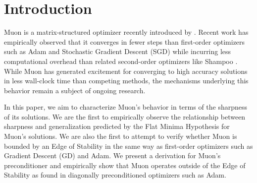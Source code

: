 \documentclass{article}
\theoremstyle{plain}
\theoremstyle{definition}
\theoremstyle{remark}
\begin{document}
\begin{abstract}

We study the Muon optimizer using sharpness and provide the first empirical evidence that the Flat Minima Hypothesis also applies to Muon. Further, we derive Muon's implicit preconditioner to analyze its potential Edge of Stability behavior. Experiments on CIFAR-10 show sharpness strongly correlates with generalization gap within each optimizer (Pearson $r=0.45-0.69, p\leq10^{-4}$), confirming the hypothesis holds for Muon similarly to Adam and SGD. However, Muon operates above the classical sharpness-based Adaptive Edge of Stability threshold that bounds diagonally-preconditioned optimizers like Adam and RMSprop, yet remains stable. Our findings suggest Muon operates in a fundamentally different regime than diagonally-adaptive methods. Defining the exact stability boundary for Muon remains an open question. All code is available at \url{https://github.com/NikoCovic/DL-project}.
\end{abstract}

\section{Introduction}
\label{introduction}

Muon is a matrix-structured optimizer recently introduced by \citet{jordan2024muon}. Recent work has empirically observed that it converges in fewer steps than first-order optimizers such as Adam \cite{kingma2014adam} and Stochastic Gradient Descent (SGD) while incurring less computational overhead than related second-order optimizers like Shampoo \cite{gupta2018shampoo}. While Muon has generated excitement for converging to high accuracy solutions in less wall-clock time than competing methods, the mechanisms underlying this behavior remain a subject of ongoing research. 

In this paper, we aim to characterize Muon's behavior in terms of the sharpness of its solutions. We are the first to empirically observe the relationship between sharpness and generalization predicted by the Flat Minima Hypothesis for Muon's solutions. We are also the first to attempt to verify whether Muon is bounded by an Edge of Stability in the same way as first-order optimizers such as Gradient Descent (GD) and Adam. We present a derivation for Muon's preconditioner and empirically show that Muon operates outside of the Edge of Stability as found in diagonally preconditioned optimizers such as Adam.
\end{document}
